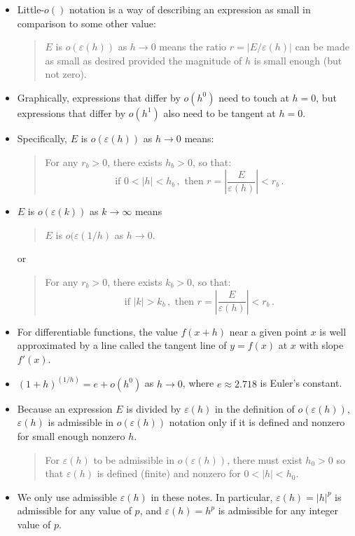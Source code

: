 \begin{itemize}
\item
Little-$o()$ notation is a way of describing an expression as small in comparison to some other value: 
\begin{quote}
  $E$ is $o(\varepsilon(h))$ as $h \rightarrow 0$ means the ratio  $r = |E/\varepsilon(h)|$  can be made as small as desired provided the magnitude of $h$ is small enough (but not zero).
\end{quote}

\item 
Graphically, expressions that differ by $o(h^0)$ need to touch at $h=0$, but expressions that differ by $o(h^1)$ also need to be tangent at $h=0$.

\item
Specifically,  $E$ is $o(\varepsilon(h))$  as $h \rightarrow 0$  means:  
\begin{quote} 
For any  $r_b > 0$,  there exists $h_b > 0$,  so that:
\begin{equation*}
\text{if\ } 0 < | h | < h_b\,,\text{\ then\ }r=\left|\frac{E}{\varepsilon(h)}\right|<r_b\,.
\end{equation*}
\end{quote}

\item 
$E$ is $o(\varepsilon(k))$ as $k \rightarrow \infty$ means
\begin{quote}
$E$ is $o(\varepsilon(1/h)$ as $h \rightarrow 0$.
\end{quote}
or
\begin{quote} 
For any  $r_b > 0$,  there exists $k_b > 0$,  so that:
\begin{equation*}
\text{if\ } |k| > k_b\,,\text{\ then\ }r=\left|\frac{E}{\varepsilon(h)}\right|<r_b\,.
\end{equation*}
\end{quote}

\item 
For differentiable functions, the value $f(x+h)$ near a given point $x$ is well  approximated by a line called the tangent line of $y=f(x)$  at $x$ with slope $f'(x)$.

\item ${(1+h)}^{(1/h)} = e + o(h^0)$ as $h \rightarrow 0$,  where  $e \approx 2.718$ is Euler's constant.

\item Because an expression $E$ is divided by $\varepsilon(h)$ in the definition of $o(\varepsilon(h))$, $\varepsilon(h)$  is admissible in $o(\varepsilon(h))$ notation only if it is defined and nonzero for small enough nonzero $h$.
\begin{quote}
For $\varepsilon(h)$ to be admissible in $o(\varepsilon(h))$, there must exist $h_0 > 0$ so that $\varepsilon(h)$ is defined (finite) and nonzero for $0 < | h | < h_0$.
\end{quote}

\item We only use admissible $\varepsilon(h)$ in these notes.  In particular,  $\varepsilon(h) = {|h|}^p$ is admissible for any value of $p$,  and $\varepsilon(h) = h^p$ is admissible for any integer value of $p$.
\end{itemize}

